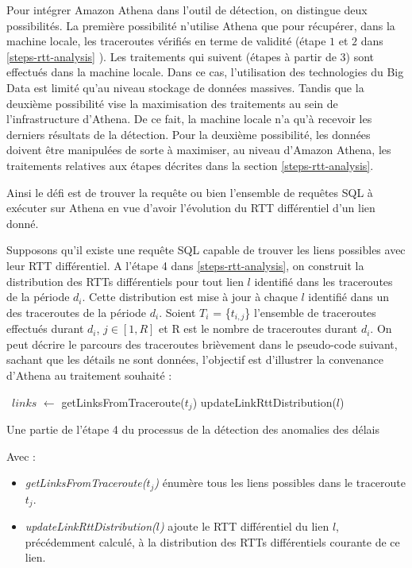 Pour intégrer Amazon Athena dans l'outil de détection, on distingue deux possibilités. La première possibilité n'utilise Athena que pour récupérer, dans la machine locale,  les traceroutes vérifiés en terme de validité (étape $1$ et $2$ dans \ref{steps-rtt-analysis} ).  Les traitements qui suivent (étapes  à partir de $3$) sont effectués dans la machine locale. Dans ce cas, l'utilisation des technologies du Big Data est limité qu'au niveau stockage de données massives. Tandis que  la deuxième possibilité vise la maximisation des traitements au sein de l'infrastructure  d'Athena. De ce fait, la machine locale n'a qu'à recevoir les derniers résultats de la détection. Pour la deuxième possibilité, les données doivent être manipulées de sorte à maximiser,  	au niveau d'Amazon Athena,  les traitements relatives aux étapes décrites dans la section \ref{steps-rtt-analysis}. 

Ainsi le défi est de trouver la requête ou bien l'ensemble de requêtes SQL à exécuter sur Athena en vue d'avoir l'évolution du RTT différentiel d'un lien donné.

Supposons qu'il existe une requête SQL capable de trouver les liens possibles avec leur RTT différentiel. A l'étape 4 dans \ref{steps-rtt-analysis}, on construit la distribution des RTTs différentiels pour tout lien $l$ identifié dans les traceroutes de la période $d_i$. Cette distribution est mise à jour à chaque $l$  identifié dans un des traceroutes  de la période $d_i$. Soient  $T_i$ = \{$t_{i, j}$\}  l'ensemble de traceroutes effectués durant $d_i$,  $j \in [1, R]$ et R est le nombre de traceroutes durant $d_i$. On peut décrire le parcours des traceroutes brièvement dans le pseudo-code suivant, sachant que les détails ne sont données, l'objectif est d'illustrer la convenance d'Athena au traitement souhaité :
\begin{algorithm}[H]
\begin{algorithmic}[1]
	  \
	  \State $links$ $\leftarrow$ getLinksFromTraceroute($t_j$)
	  	 		\State updateLinkRttDistribution($l$) \label{update-link}
	  	 \EndFor
	 \EndFor
\end{algorithmic}
\caption{Une partie de l'étape 4 du processus de la détection des anomalies des délais }
\label{alo-inference-link}
\end{algorithm}

Avec : 
\begin{itemize}
	\item \textit{getLinksFromTraceroute($t_j$)} énumère tous les liens possibles dans le traceroute $t_j$.

    \item \textit{updateLinkRttDistribution($l$)} ajoute le RTT différentiel du lien $l$, précédemment calculé, à la distribution des RTTs différentiels courante de ce lien.
\end{itemize}


